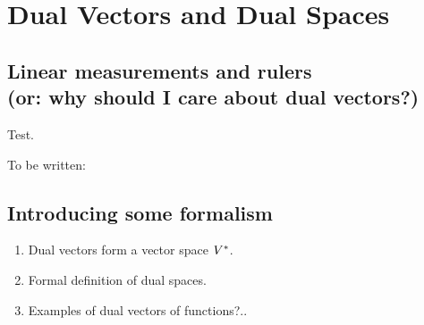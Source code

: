 \section{Dual Vectors and Dual Spaces}

\subsection{Linear measurements and rulers\\(or: why should I care about dual vectors?)}
\begin{marginfigure}
    \begin{center}
    \end{center}
    \caption{Test.}
    \label{fig:test}
\end{marginfigure}


To be written:

\subsection{Introducing some formalism}
\begin{enumerate}
    \item Dual vectors form a vector space $V^{*}$.
    \item Formal definition of dual spaces.
    \item Examples of dual vectors of functions?..
\end{enumerate}

